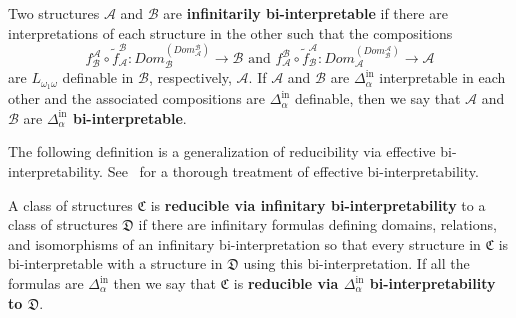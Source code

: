 \documentclass[11pt]{amsart}
\newcommand{\A}{\mathcal{A}}
\newcommand{\B}{\mathcal{B}}
\newcommand{\Dinf}[1]{\Delta^{\mathrm{in}}_{#1}}
\def\A{\mathcal A}
\def\B{\mathcal{B}}
\theoremstyle{remark}
\newcommand{\define}[1]{\textbf{#1}}
\begin{document}
\begin{definition}\label{def:infbiint}
  Two structures $\A$ and $\B$ are \define{infinitarily bi-interpretable} if
  there are interpretations of each structure in the other such that the
  compositions
  \[ f_\B^\A\circ \tilde f_\A^\B: Dom_\B^{(Dom^\B_\A)} \to \B \text{ and
  } f_\A^\B\circ \tilde f_\B^\A: Dom_\A^{(Dom^\A_\B)} \to \A\] 
  are $L_{\omega_1\omega}$ definable in $\B$, respectively, $\A$. 
  If $\A$ and $\B$ are $\Dinf{\alpha}$ interpretable in each other and the
  associated compositions are $\Dinf{\alpha}$ definable, then we say that $\A$
and $\B$ are \define{$\Dinf{\alpha}$ bi-interpretable}.\end{definition}
The following definition is a generalization of reducibility via effective
bi-interpretability. See~\cite{montalban2021} for a thorough treatment of
effective bi-interpretability.
\begin{definition}
  A class of structures $\mathfrak C$ is \define{reducible via infinitary
  bi-interpretability} to a class of structures $\mathfrak D$ if there are
  infinitary formulas defining domains, relations, and isomorphisms of an
  infinitary bi-interpretation so that every structure in $\mathfrak C$ is
  bi-interpretable with a structure in $\mathfrak D$ using this
  bi-interpretation. If all the formulas are $\Dinf{\alpha}$ then we say that
  $\mathfrak C$ is \define{reducible via $\Dinf{\alpha}$ 
  bi-interpretability to $\mathfrak D$}.
\end{definition}
\end{document}

